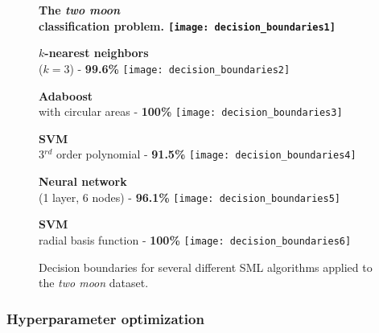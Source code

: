 \begin{figure}
	\begin{minipage}{0.33\textwidth}
		\centering
		\footnotesize \bf The \emph{two moon}\\classification problem.
		\texttt{[image: decision\_boundaries1]}
	\end{minipage}
	\begin{minipage}{0.33\textwidth}
		\centering
		\footnotesize {\bf $k$-nearest neighbors}\\($k=3$) - {\bf 99.6\%}
		\texttt{[image: decision\_boundaries2]}
	\end{minipage}
	\begin{minipage}{0.33\textwidth}
		\centering
		\footnotesize {\bf Adaboost}\\with circular areas - {\bf 100\%}
		\texttt{[image: decision\_boundaries3]}
	\end{minipage}
	\begin{minipage}{0.33\textwidth}
		\centering
		\vskip0.5cm
		\footnotesize {\bf SVM}\\3$^{rd}$ order polynomial - {\bf 91.5\%}
		\texttt{[image: decision\_boundaries4]}
	\end{minipage}
	\begin{minipage}{0.33\textwidth}
		\centering
		\vskip0.5cm
		\footnotesize {\bf Neural network}\\(1 layer, 6 nodes) - {\bf 96.1\%}
		\texttt{[image: decision\_boundaries5]}
	\end{minipage}
	\begin{minipage}{0.33\textwidth}
		\centering
		\vskip0.5cm
		\footnotesize {\bf SVM}\\radial basis function - {\bf 100\%}
		\texttt{[image: decision\_boundaries6]}
	\end{minipage}
	\caption[Decision boundaries for several different SML algorithms]{Decision boundaries for
	several different SML algorithms applied to the \emph{two moon} dataset.}
	\label{fig:decision_boundaries}
\end{figure}


\subsubsection{Hyperparameter optimization}

